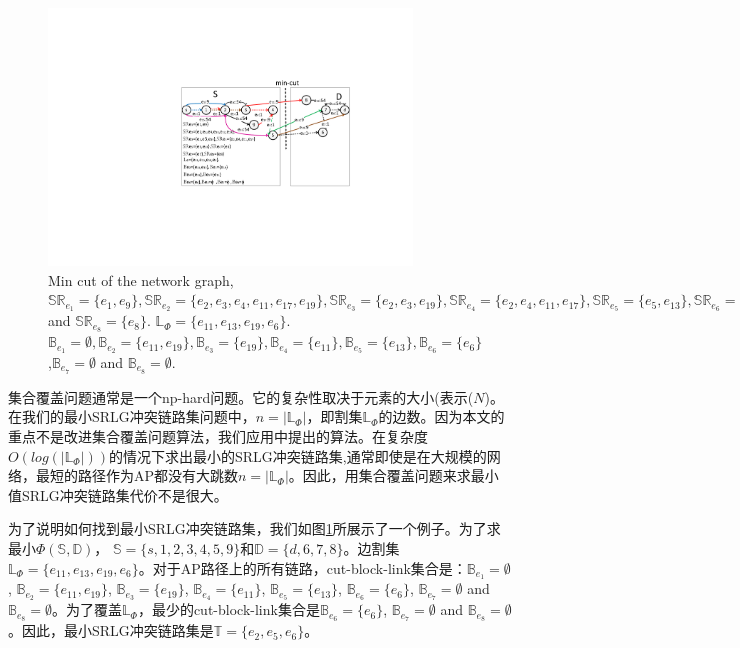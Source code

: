 \begin{figure}[htbp]
  \centering
  \includegraphics[width=3.8in]{figures/MinCutStarGraph}
  \caption{Min cut of the network graph, $\mathbb{SR}_{e_1}=\{e_1, e_9\},\mathbb{SR}_{e_2}=\{e_2,e_3,e_4, e_{11},e_{17},e_{19}\},\mathbb{SR}_{e_3}=\{e_2,e_3, e_{19}\},\mathbb{SR}_{e_4}=\{e_2,e_4, e_{11},e_{17}\},\mathbb{SR}_{e_5}=\{e_5, e_{13}\},\mathbb{SR}_{e_6}=\{e_6\},\mathbb{SR}_{e_7}=\{e_7\} $ and $\mathbb{SR}_{e_8}=\{e_8\}$. $\mathbb{L}_{\Phi}=\{e_{11},e_{13},e_{19},e_{6}\}$. $\mathbb{B}_{e_1}=\emptyset,\mathbb{B}_{e_2}=\{e_{11},e_{19}\},\mathbb{B}_{e_3}=\{e_{19}\},\mathbb{B}_{e_4}=\{e_{11}\},\mathbb{B}_{e_5}=\{e_{13}\},\mathbb{B}_{e_6}=\{e_6\}$,$\mathbb{B}_{e_7}=\emptyset$ and $\mathbb{B}_{e_8}=\emptyset$.}\label{fig:MinCutStarGraph}
  \label{fig:MinCutStarGraph}
\end{figure}

集合覆盖问题通常是一个np-hard问题。它的复杂性取决于元素的大小(表示($N$)。在我们的最小SRLG冲突链路集问题中，$n=|\mathbb{L}_{\Phi}|$，即割集$\mathbb{L}_{\Phi}$的边数。因为本文的重点不是改进集合覆盖问题算法，我们应用\cite{chvatal1979greedy}中提出的算法。在复杂度$O(log(|\mathbb{L}_{\Phi}|))$的情况下求出最小的SRLG冲突链路集,通常即使是在大规模的网络，最短的路径作为AP都没有大跳数$n=|\mathbb{L}_{\Phi}|$。因此，用集合覆盖问题来求最小值SRLG冲突链路集代价不是很大。

为了说明如何找到最小SRLG冲突链路集，我们如图\ref{fig:MinCutStarGraph}所展示了一个例子。为了求最小$\Phi(\mathbb{S},\mathbb{D})$， $\mathbb{S}=\{s, 1, 2, 3, 4, 5, 9\}$和$\mathbb{D}=\{d, 6, 7, 8\}$。边割集$\mathbb{L}_{\Phi}=\{e_{11},e_{13},e_{19},e_{6}\}$。对于AP路径上的所有链路，cut-block-link集合是：$\mathbb{B}_{e_1}=\emptyset$, $\mathbb{B}_{e_2}=\{e_{11},e_{19}\}$, $\mathbb{B}_{e_3}=\{e_{19}\}$, $\mathbb{B}_{e_4}=\{e_{11}\}$, $\mathbb{B}_{e_5}=\{e_{13}\}$, $\mathbb{B}_{e_6}=\{e_6\}$, $\mathbb{B}_{e_7}=\emptyset$ and $\mathbb{B}_{e_8}=\emptyset$。为了覆盖$\mathbb{L}_{\Phi}$，最少的cut-block-link集合是$\mathbb{B}_{e_6}=\{e_6\}$, $\mathbb{B}_{e_7}=\emptyset$ and $\mathbb{B}_{e_8}=\emptyset$。因此，最小SRLG冲突链路集是$\mathbb{T}=\{e_2, e_5, e_6 \}$。

